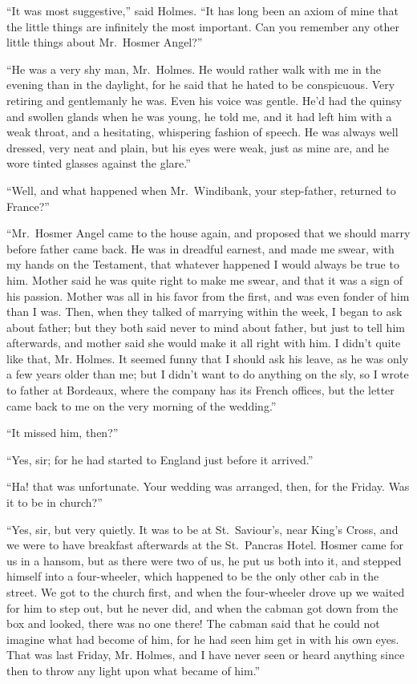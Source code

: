 “It was most suggestive,” said Holmes. “It has long been
an axiom of mine that the little things are infinitely the most
important. Can you remember any other little things about
Mr.~Hosmer Angel?”

“He was a very shy man, Mr.~Holmes. He would rather
walk with me in the evening than in the daylight, for he said
that he hated to be conspicuous. Very retiring and gentlemanly
he was. Even his voice was gentle. He’d had the
quinsy and swollen glands when he was young, he told me,
and it had left him with a weak throat, and a hesitating,
whispering fashion of speech. He was always well dressed,
very neat and plain, but his eyes were weak, just as mine are,
and he wore tinted glasses against the glare.”

“Well, and what happened when Mr.~Windibank, your step-father,
returned to France?”

“Mr.~Hosmer Angel came to the house again, and proposed
that we should marry before father came back. He was in
dreadful earnest, and made me swear, with my hands on the
Testament, that whatever happened I would always be true
to him. Mother said he was quite right to make me swear,
and that it was a sign of his passion. Mother was all in his
favor from the first, and was even fonder of him than I was.
Then, when they talked of marrying within the week, I began
to ask about father; but they both said never to mind about
father, but just to tell him afterwards, and mother said she
would make it all right with him. I didn’t quite like that, Mr.
Holmes. It seemed funny that I should ask his leave, as he
was only a few years older than me; but I didn’t want to do
anything on the sly, so I wrote to father at Bordeaux, where
the company has its French offices, but the letter came back
to me on the very morning of the wedding.”

“It missed him, then?”

“Yes, sir; for he had started to England just before it arrived.”

“Ha! that was unfortunate. Your wedding was arranged,
then, for the Friday. Was it to be in church?”

“Yes, sir, but very quietly. It was to be at St.~Saviour’s,
near King’s Cross, and we were to have breakfast afterwards
at the St.~Pancras Hotel. Hosmer came for us in a hansom,
but as there were two of us, he put us both into it, and stepped
himself into a four-wheeler, which happened to be the only
other cab in the street. We got to the church first, and when
the four-wheeler drove up we waited for him to step out, but
he never did, and when the cabman got down from the box
and looked, there was no one there! The cabman said that
he could not imagine what had become of him, for he had
seen him get in with his own eyes. That was last Friday, Mr.
Holmes, and I have never seen or heard anything since then
to throw any light upon what became of him.”

